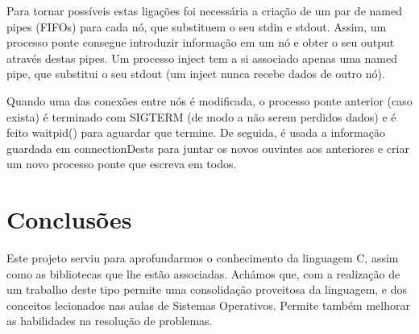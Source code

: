 \documentclass[a4paper]{article}
\begin{document}
 Para tornar possíveis estas ligações foi necessária a criação de um par de named pipes (FIFOs) para cada nó, que substituem o seu stdin e stdout. Assim, um processo ponte consegue introduzir informação em um nó e obter o seu output através destas pipes. Um processo inject tem a si associado apenas uma named pipe, que substitui o seu stdout (um inject nunca recebe dados de outro nó).

 Quando uma das conexões entre nós é modificada, o processo ponte anterior (caso exista) é terminado com SIGTERM (de modo a não serem perdidos dados) e é feito waitpid() para aguardar que termine. De seguida, é usada a informação guardada em connectionDests para juntar os novos ouvintes aos anteriores e criar um novo processo ponte que escreva em todos.

\section{Conclusões}
\label{sec:conclusao}
Este projeto serviu para aprofundarmos o conhecimento da linguagem C, assim como as bibliotecas que lhe estão associadas. Achámos que, com a realização de um trabalho deste tipo permite uma consolidação proveitosa da linguagem, e dos conceitos lecionados nas aulas de Sistemas Operativos. Permite também melhorar as habilidades na resolução de problemas.
\end{document}
